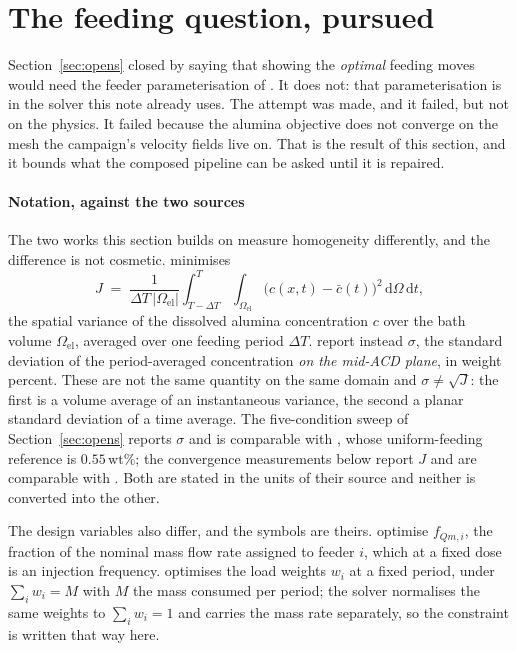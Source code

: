 \documentclass[11pt,a4paper]{article}
\theoremstyle{plain}
\theoremstyle{definition}
\theoremstyle{remark}
\begin{document}
\section{The feeding question, pursued}
\label{sec:feeding}

Section~\ref{sec:opens} closed by saying that showing the \emph{optimal} feeding
moves would need the feeder parameterisation of \cite{patouillet}. It does not:
that parameterisation is in the solver this note already uses. The attempt was
made, and it failed, but not on the physics. It failed because the alumina
objective does not converge on the mesh the campaign's velocity fields live on.
That is the result of this section, and it bounds what the composed pipeline can
be asked until it is repaired.


\paragraph{Notation, against the two sources}
The two works this section builds on measure homogeneity differently, and the
difference is not cosmetic. \cite{hofer} minimises
\[
  J \;=\; \frac{1}{\Delta T\,|\Omega_{\mathrm{el}}|}
          \int_{T-\Delta T}^{T}\!\!\int_{\Omega_{\mathrm{el}}}
          \bigl(c(x,t)-\bar c(t)\bigr)^2 \,\mathrm{d}\Omega\,\mathrm{d}t ,
\]
the spatial variance of the dissolved alumina concentration $c$ over the bath
volume $\Omega_{\mathrm{el}}$, averaged over one feeding period $\Delta T$.
\cite{patouillet} report instead $\sigma$, the standard deviation of the
period-averaged concentration \emph{on the mid-ACD plane}, in weight percent.
These are not the same quantity on the same domain and $\sigma \neq \sqrt{J}$:
the first is a volume average of an instantaneous variance, the second a planar
standard deviation of a time average. The five-condition sweep of
Section~\ref{sec:opens} reports $\sigma$ and is comparable with
\cite{patouillet}, whose uniform-feeding reference is $0.55\,\mathrm{wt\%}$; the
convergence measurements below report $J$ and are comparable with \cite{hofer}.
Both are stated in the units of their source and neither is converted into the
other.

The design variables also differ, and the symbols are theirs.
\cite{patouillet} optimise $f_{Qm,i}$, the fraction of the nominal mass flow
rate assigned to feeder $i$, which at a fixed dose is an injection frequency.
\cite{hofer} optimises the load weights $w_i$ at a fixed period, under
$\sum_i w_i = M$ with $M$ the mass consumed per period; the solver normalises
the same weights to $\sum_i w_i = 1$ and carries the mass rate separately, so the
constraint is written that way here.
\end{document}
